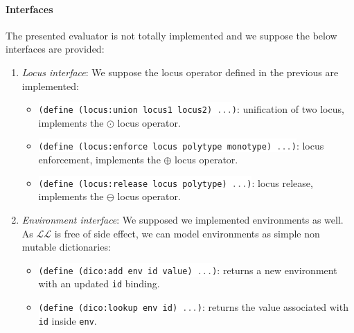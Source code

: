 \documentclass[a4paper]{report}
\newcommand{\lang}[0]{\mathcal{L}}
\newcommand{\ischeme}[1]{\colorbox{white}{\lstinline[language=scheme]&#1&}} %
\begin{document}
\paragraph{Interfaces} The presented evaluator is not totally implemented and we suppose the below interfaces are provided:
\begin{enumerate}
\item \emph{Locus interface}: We suppose the locus operator defined in the previous are implemented:
\begin{itemize}
\item \ischeme{(define (locus:union locus1 locus2) ...)}: unification of two locus, implements the $\odot$ locus operator.
\item \ischeme{(define (locus:enforce locus polytype monotype) ...)}: locus enforcement, implements the $\oplus$ locus operator.
\item \ischeme{(define (locus:release locus polytype) ...)}: locus release, implements the $\ominus$ locus operator.
\end{itemize}
\item \emph{Environment interface}: We supposed we implemented environments as well. As $\lang\lang$ is free of side effect, we can model environments as simple non mutable dictionaries:
\begin{itemize}
\item \ischeme{(define (dico:add env id value) ...)}: returns a new environment with an updated \ischeme{id} binding.
\item \ischeme{(define (dico:lookup env id) ...)}: returns the value associated with \ischeme{id} inside \ischeme{env}.
\end{itemize}
\end{enumerate}
\end{document}
